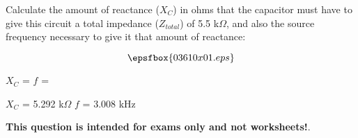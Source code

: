 

Calculate the amount of reactance ($X_C$) in ohms that the capacitor must have to give this circuit a total impedance ($Z_{total}$) of 5.5 k$\Omega$, and also the source frequency necessary to give it that amount of reactance:

$$\epsfbox{03610x01.eps}$$

\vskip 10pt

$X_C$ =  \hskip 100pt $f$ = 







$X_C$ = 5.292 k$\Omega$ \hskip 100pt $f$ = 3.008 kHz







{\bf This question is intended for exams only and not worksheets!}.




